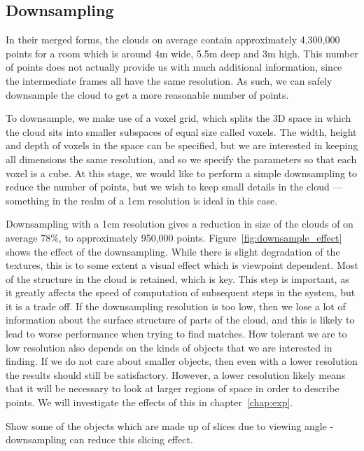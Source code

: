 \documentclass[11pt,a4paper]{kth-mag}
\begin{document}
\subsection{Downsampling}
In their merged forms, the clouds on average contain approximately 4,300,000
points for a room which is around 4m wide, 5.5m deep and 3m high. This number of
points does not actually provide us with much additional information, since the
intermediate frames all have the same resolution. As such, we can safely
downsample the cloud to get a more reasonable number of points.

To downsample, we make use of a voxel grid, which splits the 3D space in which
the cloud sits into smaller subspaces of equal size called voxels. The width,
height and depth of voxels in the space can be specified, but we are interested
in keeping all dimensions the same resolution, and so we specify the parameters
so that each voxel is a cube. At this stage, we would like to perform a simple
downsampling to reduce the number of points, but we wish to keep small details
in the cloud --- something in the realm of a 1cm resolution is ideal in this
case.

Downsampling with a 1cm resolution gives a reduction in size of the clouds of on
average 78\%, to approximately 950,000 points.
Figure~\ref{fig:downsample_effect} shows the effect of the downsampling. While
there is slight degradation of the textures, this is to some extent a visual
effect which is viewpoint dependent. Most of the structure in the cloud is
retained, which is key. This step is important, as it greatly affects the speed
of computation of subsequent steps in the system, but it is a trade off. If the
downsampling resolution is too low, then we lose a lot of information about the
surface structure of parts of the cloud, and this is likely to lead to worse
performance when trying to find matches. How tolerant we are to low resolution
also depends on the kinds of objects that we are interested in finding. If we do
not care about smaller objects, then even with a lower resolution the results
should still be satisfactory. However, a lower resolution likely means that it
will be necessary to look at larger regions of space in order to describe
points. We will investigate the effects of this in chapter~\ref{chap:exp}.

Show some of the objects which are made up of slices due to viewing angle -
downsampling can reduce this slicing effect.
\end{document}
